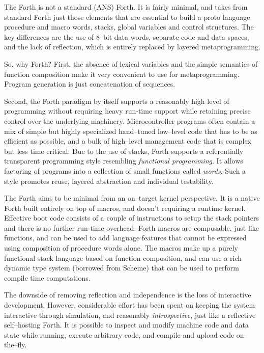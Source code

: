 \documentclass[12pt]{article}
\begin{document}
The Forth is not a standard (ANS) Forth. It is fairly minimal, and
takes from standard Forth just those elements that are essential to
build a proto language: procedure and macro words, stacks, global
variables and control structures.  The key differences are the use of
8--bit data words, separate code and data spaces, and the lack of
reflection, which is entirely replaced by layered metaprogramming.

So, why Forth? First, the absence of lexical variables and the simple
semantics of function composition make it very convenient to use for
metaprogramming. Program generation is just concatenation of sequences.

Second, the Forth paradigm by itself supports a reasonably high level
of programming without requiring heavy run-time support while
retaining precise control over the underlying
machinery. Microcontroller programs often contain a mix of simple but
highly specialized hand--tuned low--level code that has to be as
efficient as possible, and a bulk of high--level management code that
is complex but less time critical. Due to the use of stacks,
Forth supports a referentially transparent programming style
resembling \emph{functional programming}. It allows factoring of
programs into a collection of small functions called \emph{words}.
Such a style promotes reuse, layered abstraction and individual
testability.

The Forth aims to be minimal from an on--target kernel perspective. It
is a native Forth built entirely on top of macros, and doesn't
requiring a runtime kernel. Effective boot code consists of a couple
of instructions to setup the stack pointers and there is no further
run-time overhead. Forth macros are composable, just like functions,
and can be used to add language features that cannot be expressed
using composition of procedure words alone. The macros make up a
purely functional stack language based on function composition, and
can use a rich dynamic type system (borrowed from Scheme) that can be
used to perform compile time computations.

The downside of removing reflection and independence is the loss of
interactive development. However, considerable effort has been spent
on keeping the system interactive through simulation, and reasonably
\emph{introspective}, just like a reflective self--hosting Forth.  It
is possible to inspect and modify machine code and data state while
running, execute arbitrary code, and compile and upload code
on--the--fly.
\end{document}
